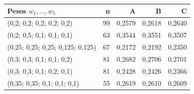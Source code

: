 \begin{tabular}{lrrrr}
\toprule
Pesos $w_1,\ldots,w_5$ & n & A & B & C \\
\midrule
(0,2; 0,2; 0,2; 0,2; 0,2) & 99 & 0,2579 & 0,2618 & 0,2640 \\
(0,2; 0,5; 0,1; 0,1; 0,1) & 63 & 0,3544 & 0,3551 & 0,3507 \\
(0,25; 0,25; 0,25; 0,125; 0,125) & 67 & 0,2172 & 0,2192 & 0,2350 \\
(0,3; 0,3; 0,1; 0,1; 0,2) & 81 & 0,2682 & 0,2706 & 0,2701 \\
(0,3; 0,3; 0,1; 0,2; 0,1) & 81 & 0,2428 & 0,2426 & 0,2366 \\
(0,35; 0,35; 0,1; 0,1; 0,1) & 55 & 0,2619 & 0,2610 & 0,2609 \\
\bottomrule
\end{tabular}
